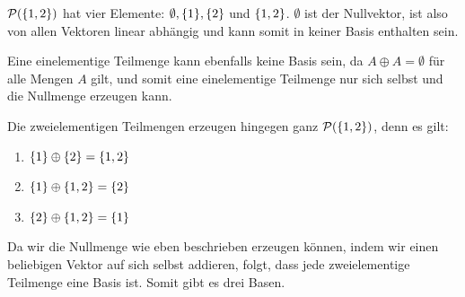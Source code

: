 \documentclass{article}
\begin{document}
\begin{enumerate}
	$\mathcal{P}(\qty{1,2})$ hat vier Elemente: $\emptyset, \qty{1}, \qty{2}$ und $\qty{1,2}$. $\emptyset$ ist der Nullvektor, ist also von allen Vektoren linear abhängig und kann somit in keiner Basis enthalten sein. 
	
	Eine einelementige Teilmenge kann ebenfalls keine Basis sein, da $A \oplus A = \emptyset$ für alle Mengen $A$ gilt, und somit eine einelementige Teilmenge nur sich selbst und die Nullmenge erzeugen kann. 
	
	Die zweielementigen Teilmengen erzeugen hingegen ganz $\mathcal{P}(\qty{1,2})$, denn es gilt:
	\begin{enumerate}
		\item $\qty{1} \oplus \qty{2} = \qty{1,2}$
		\item $\qty{1} \oplus \qty{1,2} = \qty{2}$
		\item $\qty{2} \oplus \qty{1,2} = \qty{1}$
	\end{enumerate}
	Da wir die Nullmenge wie eben beschrieben erzeugen können, indem wir einen beliebigen Vektor auf sich selbst addieren, folgt, dass jede zweielementige Teilmenge eine Basis ist. Somit gibt es drei Basen.
\end{enumerate}
\end{document}
